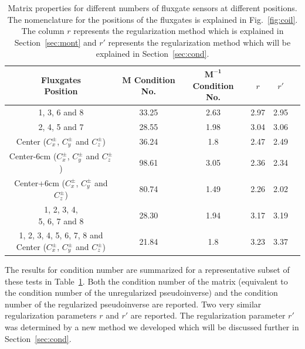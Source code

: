 \begin{table}%
    \centering
    \begin{tabular} { |c|c|c|c|c|c|} 
        \hline
        \makecell{Fluxgates \\Position} & \makecell{$\bm{M}$\\ Condition No.} &\makecell{$\bm{M^{-1}}$\\ Condition No.} & $r$ & $r'$\\
        \hline\hline
        1, 3, 6 and 8 & 33.25 & 2.63 & 2.97 & 2.95\\ 
        \hline
        2, 4, 5 and 7 & 28.55 & 1.98 & 3.04 & 3.06 \\ 
        \hline
        \makecell{Center \\($C_x^\pm$, $C_y^\pm$ and $C_z^\pm$)} & 36.24 & 1.8 & 2.47 & 2.49 \\ 
        \hline
        \makecell{Center-6cm \\($C_x^\pm$, $C_y^\pm$ and $C_z^\pm$)} & 98.61 & 3.05 & 2.36 & 2.34 \\ 
        \hline
        \makecell{Center+6cm \\($C_x^\pm$, $C_y^\pm$ and $C_z^\pm$)} & 80.74 & 1.49 & 2.26 & 2.02 \\ 
        \hline
        \makecell{1, 2, 3, 4, \\5, 6, 7 and 8} & 28.30 & 1.94 & 3.17 & 3.19 \\ 
        \hline
        \makecell{1, 2, 3, 4, \\5, 6, 7, 8 and \\Center ($C_x^\pm$, $C_y^\pm$ and $C_z^\pm$)}  & 21.84 & 1.8 & 3.23 & 3.37 \\ 
        \hline

    \end{tabular}\caption[Matrix properties for different numbers of
   fluxgate sensors at different positions.]{Matrix properties for
   different numbers of fluxgate sensors at different positions.  The
   nomenclature for the positions of the fluxgates is explained in
   Fig.~\ref{fig:coil}.  The column $r$ represents the regularization
   method which is explained in Section~\ref{sec:mont} and $r'$
   represents the regularization method which will be explained in
   Section~\ref{sec:cond}.}\label{table:flux-pos}
\end{table}

The results for condition number are summarized for a representative
subset of these tests in Table~\ref{table:flux-pos}.  Both the
condition number of the matrix (equivalent to the condition number of
the unregularized pseudoinverse) and the condition number of the
regularized pseudoinverse are reported.  Two very similar
regularization parameters $r$ and $r'$ are reported.  The
regularization parameter $r'$ was determined by a new method we
developed which will be discussed further in
Section~\ref{sec:cond}.

